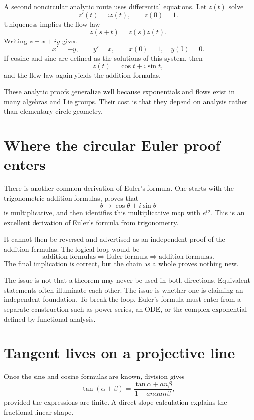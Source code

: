 A second noncircular analytic route uses differential equations.  Let \(z(t)\) solve
\[
  z'(t)=iz(t),
  \qquad
  z(0)=1.
\]
Uniqueness implies the flow law
\[
  z(s+t)=z(s)z(t).
\]
Writing \(z=x+iy\) gives
\[
  x'=-y,
  \qquad
  y'=x,
  \qquad
  x(0)=1,
  \quad
  y(0)=0.
\]
If cosine and sine are defined as the solutions of this system, then
\[
  z(t)=\cos t+i\sin t,
\]
and the flow law again yields the addition formulas.

These analytic proofs generalize well because exponentials and flows exist in many algebras and Lie groups.  Their cost is that they depend on analysis rather than elementary circle geometry.

\section{Where the circular Euler proof enters}

There is another common derivation of Euler's formula.  One starts with the trigonometric addition formulas, proves that
\[
  \theta\longmapsto \cos\theta+i\sin\theta
\]
is multiplicative, and then identifies this multiplicative map with \(e^{i\theta}\).  This is an excellent derivation of Euler's formula from trigonometry.

It cannot then be reversed and advertised as an independent proof of the addition formulas.  The logical loop would be
\[
  \text{addition formulas}
  \Longrightarrow
  \text{Euler formula}
  \Longrightarrow
  \text{addition formulas}.
\]
The final implication is correct, but the chain as a whole proves nothing new.

The issue is not that a theorem may never be used in both directions.  Equivalent statements often illuminate each other.  The issue is whether one is claiming an independent foundation.  To break the loop, Euler's formula must enter from a separate construction such as power series, an ODE, or the complex exponential defined by functional analysis.

\section{Tangent lives on a projective line}

Once the sine and cosine formulas are known, division gives
\[
  \tan(\alpha+\beta)
  =
  \frac{\tan\alpha+	an\beta}
  {1-	an\alpha	an\beta},
\]
provided the expressions are finite.  A direct slope calculation explains the fractional-linear shape.

